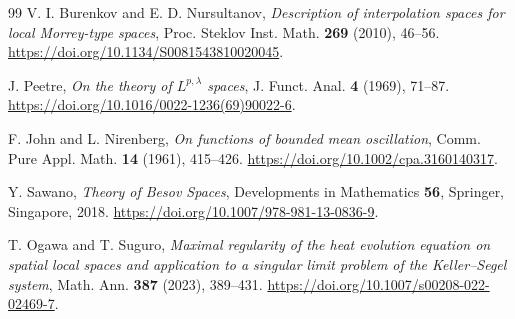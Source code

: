 \documentclass[smallextended,envcountsect,envcountsame]{svjour3}
\begin{document}
\begin{thebibliography}{99}
V. I. Burenkov and E. D. Nursultanov,
\emph{Description of interpolation spaces for local Morrey-type spaces},
Proc. Steklov Inst. Math. \textbf{269} (2010), 46--56.
\url{https://doi.org/10.1134/S0081543810020045}.

J. Peetre,
\emph{On the theory of $L^{p,\lambda}$ spaces},
J. Funct. Anal. \textbf{4} (1969), 71--87.
\url{https://doi.org/10.1016/0022-1236(69)90022-6}.

F. John and L. Nirenberg,
\emph{On functions of bounded mean oscillation},
Comm. Pure Appl. Math. \textbf{14} (1961), 415--426.
\url{https://doi.org/10.1002/cpa.3160140317}.

Y. Sawano,
\emph{Theory of Besov Spaces},
Developments in Mathematics \textbf{56}, Springer, Singapore, 2018.
\url{https://doi.org/10.1007/978-981-13-0836-9}.

T. Ogawa and T. Suguro,
\emph{Maximal regularity of the heat evolution equation on spatial local spaces and application to a singular limit problem of the Keller--Segel system},
Math. Ann. \textbf{387} (2023), 389--431.
\url{https://doi.org/10.1007/s00208-022-02469-7}.
\end{thebibliography}
\end{document}
